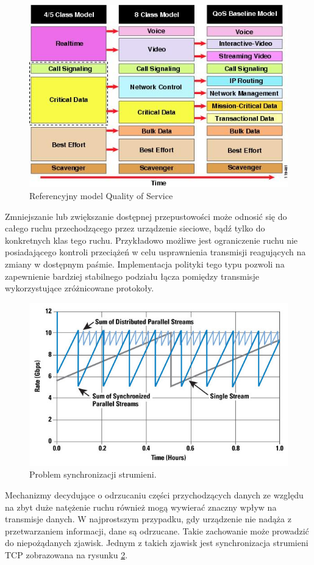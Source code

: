 \begin{figure}[h!]
	\centering
		\includegraphics[width=0.7\linewidth]{qosmodel}
	\caption{Referencyjny model Quality of Service}
	\label{fig:qosmodel}
\end{figure}

Zmniejszanie lub zwiększanie dostępnej przepustowości może odnosić się do całego ruchu przechodzącego przez urządzenie sieciowe, bądź tylko do konkretnych klas tego ruchu. Przykładowo możliwe jest ograniczenie ruchu nie posiadającego kontroli przeciążeń w celu usprawnienia transmisji reagujących na zmiany w dostępnym paśmie. Implementacja polityki tego typu pozwoli na zapewnienie bardziej stabilnego podziału łącza pomiędzy transmisje wykorzystujące zróżnicowane protokoły.

\begin{figure}[h!]
	\centering
		\includegraphics[width=0.7\linewidth]{tcpsynchro}
	\caption{Problem synchronizacji strumieni.}
	\label{fig:tcpsynchro}
\end{figure}

Mechanizmy decydujące o odrzucaniu części przychodzących danych ze względu na zbyt duże natężenie ruchu również mogą wywierać znaczny wpływ na transmisje danych. W najprostszym przypadku, gdy urządzenie nie nadąża z przetwarzaniem informacji, dane są odrzucane. Takie zachowanie może prowadzić do niepożądanych zjawisk. Jednym z takich zjawisk jest synchronizacja strumieni TCP zobrazowana na rysunku \ref{fig:tcpsynchro}.

